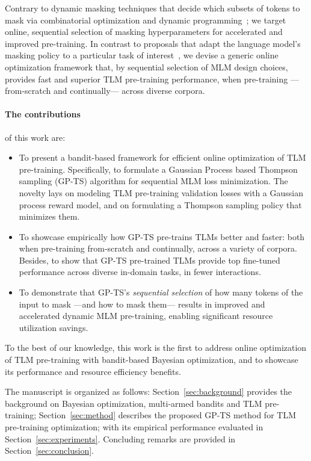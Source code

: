 Contrary to dynamic masking techniques that decide which subsets of tokens to mask via combinatorial optimization and dynamic programming~\citep{j-Vu2020};
we target online, sequential selection of masking hyperparameters for accelerated and improved pre-training.
In contrast to proposals that adapt the language model's masking policy to a particular task of interest~\citep{j-Kang2020},
we devise a generic online optimization framework that,
by sequential selection of MLM design choices,
provides fast and superior TLM pre-training performance, when pre-training ---from-scratch and continually--- across diverse corpora.

\paragraph*{The contributions}\hspace*{-2ex} of this work are:
\begin{itemize}[leftmargin=*]
	\item To present a bandit-based framework for efficient online optimization of TLM pre-training.
	Specifically, to formulate a Gaussian Process based Thompson sampling (GP-TS) algorithm for sequential MLM loss minimization.
	The novelty lays on modeling TLM pre-training validation losses with a Gaussian process reward model,
	and on formulating a Thompson sampling policy that minimizes them.
	
	\item To showcase empirically how GP-TS pre-trains TLMs better and faster:
	both when pre-training from-scratch and continually, across a variety of corpora.
	Besides, to show that GP-TS pre-trained TLMs provide top fine-tuned performance across diverse in-domain tasks, in fewer interactions.	
	
	\item To demonstrate that GP-TS's \textit{sequential selection} of how many tokens of the input to mask ---and how to mask them--- 
	results in improved and accelerated dynamic MLM pre-training, enabling significant resource utilization savings.	
\end{itemize}

To the best of our knowledge,
this work is the first
to address online optimization of TLM pre-training with bandit-based Bayesian optimization, 
and to showcase its performance and resource efficiency benefits.

The manuscript is organized as follows:
Section~\ref{sec:background} provides the background on Bayesian optimization, multi-armed bandits and TLM pre-training;
Section~\ref{sec:method} describes the proposed GP-TS method for TLM pre-training optimization;
with its empirical performance evaluated in Section~\ref{sec:experiments}.
Concluding remarks are provided in Section~\ref{sec:conclusion}.
\vspace*{-1ex}
